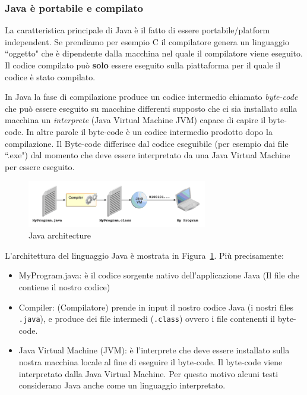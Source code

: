 \documentclass{article}
\theoremstyle{definition}
\begin{document}
\subsubsection{Java \`e portabile e compilato}
La caratteristica principale di Java \`e il fatto di essere portabile/platform independent. 
Se prendiamo per esempio C il compilatore genera un linguaggio ``oggetto" che \`e dipendente dalla macchina nel quale il compilatore viene eseguito. 
Il codice compilato pu\`o \textbf{solo} essere eseguito sulla piattaforma per il quale il codice \`e stato compilato.

In Java la fase di compilazione produce un codice intermedio chiamato \emph{byte-code} che pu\`o essere eseguito su macchine differenti supposto che ci sia installato sulla macchina un \emph{interprete} (Java Virtual Machine JVM) capace di capire il byte-code. 
In altre parole il byte-code \`e un codice intermedio prodotto dopo la compilazione. Il Byte-code differisce dal codice eseguibile (per esempio dai file ``.exe") dal momento che deve essere interpretato da una  Java Virtual Machine per essere eseguito.

\begin{figure}[h]
\centering
    \includegraphics[width=0.7\textwidth]{Img/jvm-architecture.png}
    \caption{Java architecture}
    \label{JavaArchitecture}
\end{figure}

L'architettura del linguaggio Java \`e mostrata in Figura~\ref{JavaArchitecture}. Pi\`u precisamente:

\begin{itemize}
\item MyProgram.java: \`e il codice sorgente nativo dell'applicazione Java (Il file che contiene il nostro codice)
\item Compiler: (Compilatore) prende in input il nostro codice Java  (i nostri files \texttt{.java}), e produce dei file intermedi  (\texttt{.class}) ovvero i file contenenti il byte-code.
\item Java Virtual Machine (JVM): \`e l'interprete che deve essere installato sulla nostra macchina locale al fine di eseguire il byte-code. 
Il byte-code viene interpretato dalla Java Virtual Machine. Per questo motivo alcuni testi considerano Java anche come un linguaggio interpretato.
\end{itemize}
\end{document}
